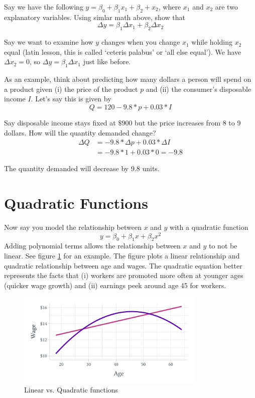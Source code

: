 \documentclass[12pt]{article}
\begin{document}
Say we have the following $y = \beta_0 + \beta_1 x_1 + \beta_2 + x_2$, where $x_1$ and $x_2$ are two explanatory variables. Using simlar math above, show that 
$$
  \Delta y = \beta_1 \Delta x_1 + \beta_2 \Delta x_2
$$

Say we want to examine how $y$ changes when you change $x_1$ while holding $x_2$ equal (latin lesson, this is called `ceteris palabus' or `all else equal'). We have $\Delta x_2 = 0$, so $\Delta y = \beta_1 \Delta x_1$ just like before. 

As an example, think about predicting how many dollars a person will spend on a product given (i) the price of the product $p$ and (ii) the consumer's disposable income $I$. Let's say this is given by 
$$
  Q = 120 - 9.8 * p + 0.03 * I
$$

Say disposable income stays fixed at $\$900$ but the price increases from 8 to 9 dollars. How will the quantity demanded change?
\begin{align*}
  \Delta Q 
  &= -9.8 * \Delta p + 0.03 * \Delta I \\
  &= -9.8 * 1 + 0.03 * 0 = -9.8
\end{align*}

The quantity demanded will decrease by 9.8 units.


\section{Quadratic Functions}

Now say you model the relationship between $x$ and $y$ with a quadratic function
$$
y = \beta_0 + \beta_1 x + \beta_2 x^2
$$
Adding polynomial terms allows the relationship between $x$ and $y$ to not be linear. See figure \ref{fig:example_wage} for an example. The figure plots a linear relationship and quadratic relationship between age and wages. The quadratic equation better represents the facts that (i) workers are promoted more often at younger ages (quicker wage growth) and (ii) earnings peek around age 45 for workers.

\begin{figure}
  \caption{Linear vs. Quadratic functions}
  \label{fig:example_wage}
  \begin{center}
    \includegraphics[width=0.8\textwidth]{figures/wage_models.pdf}
  \end{center}
\end{figure}
\end{document}
